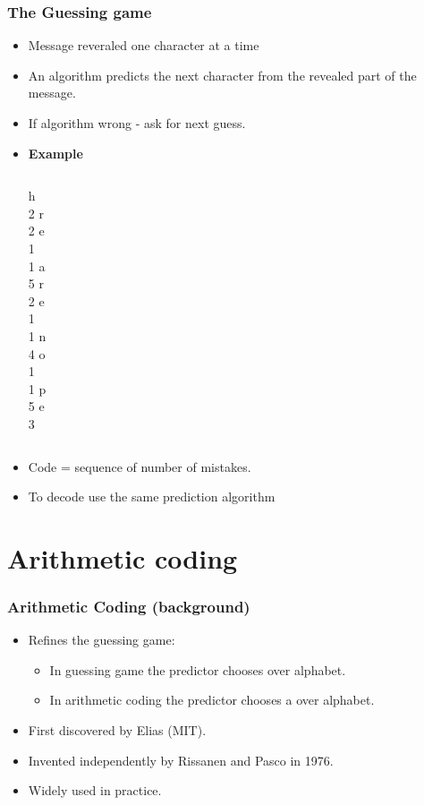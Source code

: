 \documentclass[handout]{beamer}
\begin{document}
\begin{frame}
\frametitle{The Guessing game}
\begin{itemize}
\item
Message reveraled one character at a time
\item
An algorithm predicts the next character from the revealed part of the message.
\item
If algorithm wrong - ask for next guess.
\item
{\bf Example} 
\begin{columns}
\column[t]{0.1cm} h \\ 2 
\column[t]{0.1cm} r \\ 2 
\column[t]{0.1cm} e \\ 1 
\column[t]{0.1cm}   \\ 1 
\column[t]{0.1cm} a \\ 5 
\column[t]{0.1cm} r \\ 2 
\column[t]{0.1cm} e \\ 1 
\column[t]{0.1cm}   \\ 1 
\column[t]{0.1cm} n \\ 4 
\column[t]{0.1cm} o \\ 1 
\column[t]{0.1cm}   \\ 1 
\column[t]{0.1cm} p \\ 5 
\column[t]{0.1cm} e \\ 3 
\end{columns}
\item
Code = sequence of number of mistakes.
\item
To decode use the same prediction algorithm
\end{itemize}

\end{frame}

\section{Arithmetic coding}

\begin{frame}
\frametitle{Arithmetic Coding (background)}
\begin{itemize}
\item Refines the guessing game:
\begin{itemize}
\item In guessing game the predictor chooses  over alphabet.
\item In arithmetic coding the predictor chooses a  over alphabet.
\end{itemize}
\item First discovered by Elias (MIT).
\item Invented independently by Rissanen and Pasco in 1976.
\item Widely used in practice.
\end{itemize}
\end{frame}
\end{document}
